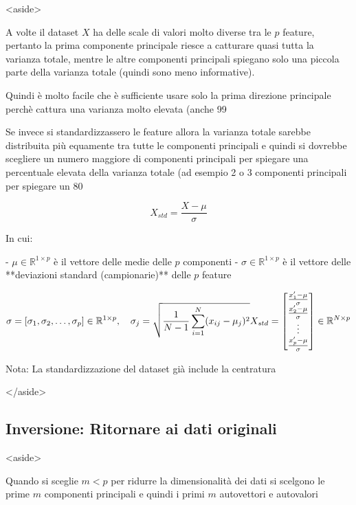 <aside>


A volte il dataset $X$ ha delle scale di valori molto diverse tra le $p$ feature, pertanto la prima componente principale riesce a catturare quasi tutta la varianza totale, mentre le altre componenti principali spiegano solo una piccola parte della varianza totale (quindi sono meno informative). 

Quindi è molto facile che è sufficiente usare solo la prima direzione principale perchè cattura una varianza molto elevata (anche 99%

Se invece si standardizzassero le feature allora la varianza totale sarebbe distribuita più equamente tra tutte le componenti principali e quindi si dovrebbe scegliere un numero maggiore di componenti principali per spiegare una percentuale elevata della varianza totale (ad esempio 2 o 3 componenti principali per spiegare un 80%

$$
X_{std} = \frac{X - \mu}{\sigma}
$$

In cui:

- $\mu\in\mathbb{R}^{1\times p}$ è il vettore delle medie delle $p$  componenti
- $\sigma \in \mathbb{R}^{1 \times p}$ è il vettore delle **deviazioni standard (campionarie)** delle $p$ feature

$$
\sigma = \left[ \sigma_1, \sigma_2, \dots, \sigma_p \right] \in \mathbb{R}^{1 \times p},\quad \sigma_j = \sqrt{\frac{1}{N-1} \sum_{i=1}^{N} (x_{ij} - \mu_j)^2}\\[.4cm]

X_{std}=\begin{bmatrix}
	\frac{x'_1-\mu}{\sigma} \\
	\frac{x'_2-\mu}{\sigma}\\
	\vdots\\
	\frac{x'_p-\mu}{\sigma}
\end{bmatrix}\in\mathbb{R}^{N\times p}
$$


Nota: La standardizzazione del dataset già include la centratura

</aside>

\subsection{Inversione: Ritornare ai dati originali}

<aside>


Quando si sceglie $m<p$ per ridurre la dimensionalità dei dati si scelgono le prime $m$ componenti principali e quindi i primi $m$ autovettori e autovalori

